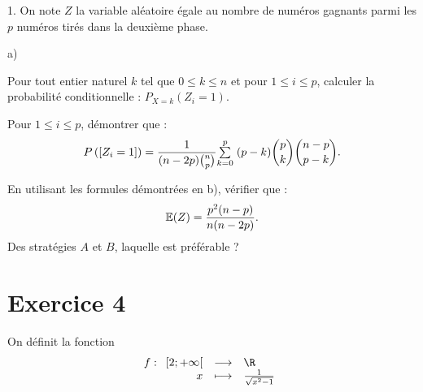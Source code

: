 \documentclass[11pt]{article}%
\begin{document}
\begin{noliste}{1.}
On note $Z$ la variable aléatoire égale au nombre de numéros
gagnants parmi les $p$ numéros tirés dans la deuxième phase.

\item 
\begin{noliste}{a)}
 \setlength{\itemsep}{2mm}
\item Pour tout entier naturel $k$ tel que $0\leq k\leq n$ et pour
$1\leq
i\leq p$, calculer la probabilité conditionnelle : $P_{X = k}(Z_{i} =
1)$.

\item Pour $1\leq i\leq p$, démontrer que : 
\[
P\left(\left[ {Z_{i} = 1} \right]\right) = \frac{1}{(n-2p)\binom{n}{p}}{\textstyle\sum\limits_{k =
0}^{p}}\hspace{.1cm}(p-k)\binom{p}{k}\binom{n-p}{p-k}.
\]

\item En utilisant les formules démontrées en b), vérifier que : 
\[
\mathbb{E}(Z) = \frac{p^{2}(n-p)}{n(n-2p)}.
\]
Des stratégies $A$ et $B$, laquelle est préférable ?
\end{noliste}
\end{noliste}

\section*{Exercice 4}

On définit la fonction 
\[
f :\begin{array}[t]{rcl}
\lbrack 2;{+ \infty }[ & \longrightarrow & {\R\xspace} \\
x & \longmapsto & \frac{1}{\sqrt{x^{2}-1}}
\end{array}
\]
\end{document}
